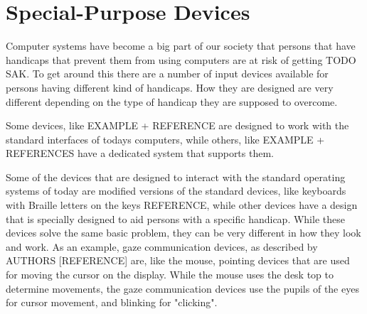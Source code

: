 \section{Special-Purpose Devices}

Computer systems have become a big part of our society that persons that have handicaps that prevent them from using computers are at risk of getting TODO SAK. To get around this there are a number of input devices available for persons having different kind of handicaps. How they are designed are very different depending on the type of handicap they are supposed to overcome. 

Some devices, like EXAMPLE + REFERENCE are designed to work with the standard interfaces of todays computers, while others, like EXAMPLE + REFERENCES have a dedicated system that supports them. 

Some of the devices that are designed to interact with the standard operating systems of today are modified versions of the standard devices, like keyboards with Braille letters on the keys REFERENCE, while other devices have a design that is specially designed to aid persons with a specific handicap. While these devices solve the same basic problem, they can be very different in how they look and work. As an example, gaze communication devices, as described by AUTHORS [REFERENCE] are, like the mouse, pointing devices that are used for moving the cursor on the display. While the mouse uses the desk top to determine movements, the gaze communication devices use the pupils of the eyes for cursor movement, and blinking for "clicking".